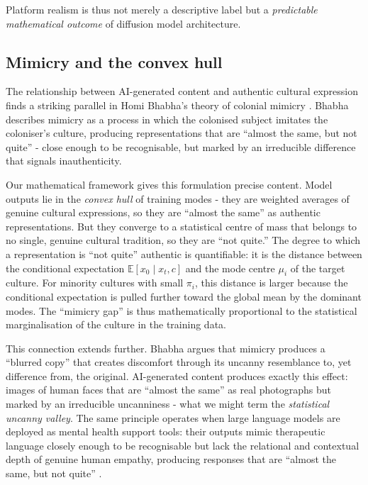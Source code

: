 \documentclass[11pt]{article}
\begin{document}
Platform realism is thus not merely a descriptive label but a \textit{predictable mathematical outcome} of diffusion model architecture.

\subsection{Mimicry and the convex hull}

The relationship between AI-generated content and authentic cultural expression finds a striking parallel in Homi Bhabha's theory of colonial mimicry \citep{Bhabha1984, Bhabha1994}. Bhabha describes mimicry as a process in which the colonised subject imitates the coloniser's culture, producing representations that are ``almost the same, but not quite'' - close enough to be recognisable, but marked by an irreducible difference that signals inauthenticity.

Our mathematical framework gives this formulation precise content. Model outputs lie in the \textit{convex hull} of training modes - they are weighted averages of genuine cultural expressions, so they are ``almost the same'' as authentic representations. But they converge to a statistical centre of mass that belongs to no single, genuine cultural tradition, so they are ``not quite.'' The degree to which a representation is ``not quite'' authentic is quantifiable: it is the distance between the conditional expectation $\mathbb{E}[x_0 \mid x_t, c]$ and the mode centre $\mu_i$ of the target culture. For minority cultures with small $\pi_i$, this distance is larger because the conditional expectation is pulled further toward the global mean by the dominant modes. The ``mimicry gap'' is thus mathematically proportional to the statistical marginalisation of the culture in the training data.

This connection extends further. Bhabha argues that mimicry produces a ``blurred copy'' that creates discomfort through its uncanny resemblance to, yet difference from, the original. AI-generated content produces exactly this effect: images of human faces that are ``almost the same'' as real photographs but marked by an irreducible uncanniness - what we might term the \textit{statistical uncanny valley}. The same principle operates when large language models are deployed as mental health support tools: their outputs mimic therapeutic language closely enough to be recognisable but lack the relational and contextual depth of genuine human empathy, producing responses that are ``almost the same, but not quite'' \citep{Bhabha1984}.
\end{document}
